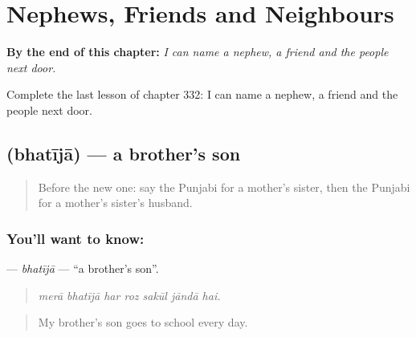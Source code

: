 
\chapter{Nephews, Friends and Neighbours}
\label{ch:pa-a2-nephews-friends-and-neighbours}

\begin{chapteropening}
\textbf{By the end of this chapter:} \emph{I can name a nephew, a friend and the people next door.}

Complete the last lesson of chapter 332: I can name a nephew, a friend and the people next door.
\end{chapteropening}

\section[\texorpdfstring{\pa{ਭਤੀਜਾ} (bhatījā)}{ਭਤੀਜਾ (bhatījā)}]{ (bhatījā) — a brother's son}

\label{lesson:PA-C332-bhatija}



\begin{quote}
Before the new one: say the Punjabi for a mother's sister, then the Punjabi for a mother's sister's husband.
\end{quote}

\subsection*{You'll want to know: }
\textbf{} — \emph{bhatījā} — \textquotedblleft{}a brother's son\textquotedblright{}.

\begin{quote}
      
\end{quote}

\begin{quote}
\emph{merā bhatījā har roz sakūl jāndā hai.}
\end{quote}

\begin{quote}
My brother's son goes to school every day.
\end{quote}

